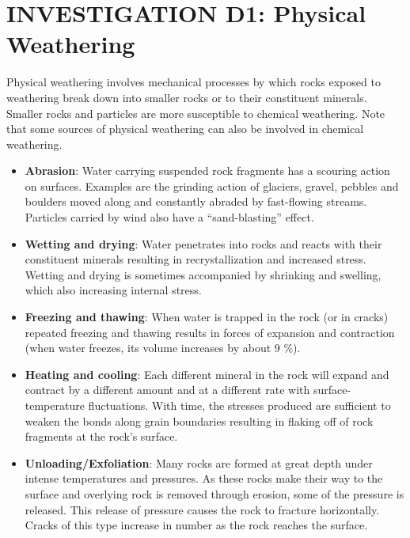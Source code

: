 \documentclass[
  letterpaper,
  twocolumn,
  portrait]{scrbook}
\begin{document}
\hypertarget{investigation-d1-physical-weathering}{%
\section{INVESTIGATION D1: Physical
Weathering}\label{investigation-d1-physical-weathering}}

Physical weathering involves mechanical processes by which rocks exposed
to weathering break down into smaller rocks or to their constituent
minerals. Smaller rocks and particles are more susceptible to chemical
weathering. Note that some sources of physical weathering can also be
involved in chemical weathering.

\begin{itemize}
\item
  \textbf{Abrasion}: Water carrying suspended rock fragments has a
  scouring action on surfaces. Examples are the grinding action of
  glaciers, gravel, pebbles and boulders moved along and constantly
  abraded by fast-flowing streams. Particles carried by wind also have a
  ``sand-blasting'' effect.
\item
  \textbf{Wetting and drying}: Water penetrates into rocks and reacts
  with their constituent minerals resulting in recrystallization and
  increased stress. Wetting and drying is sometimes accompanied by
  shrinking and swelling, which also increasing internal stress.
\item
  \textbf{Freezing and thawing}: When water is trapped in the rock (or
  in cracks) repeated freezing and thawing results in forces of
  expansion and contraction (when water freezes, its volume increases by
  about 9 \%).
\item
  \textbf{Heating and cooling}: Each different mineral in the rock will
  expand and contract by a different amount and at a different rate with
  surface-temperature fluctuations. With time, the stresses produced are
  sufficient to weaken the bonds along grain boundaries resulting in
  flaking off of rock fragments at the rock's surface.
\item
  \textbf{Unloading/Exfoliation}: Many rocks are formed at great depth
  under intense temperatures and pressures. As these rocks make their
  way to the surface and overlying rock is removed through erosion, some
  of the pressure is released. This release of pressure causes the rock
  to fracture horizontally. Cracks of this type increase in number as
  the rock reaches the surface.
\end{itemize}
\end{document}
